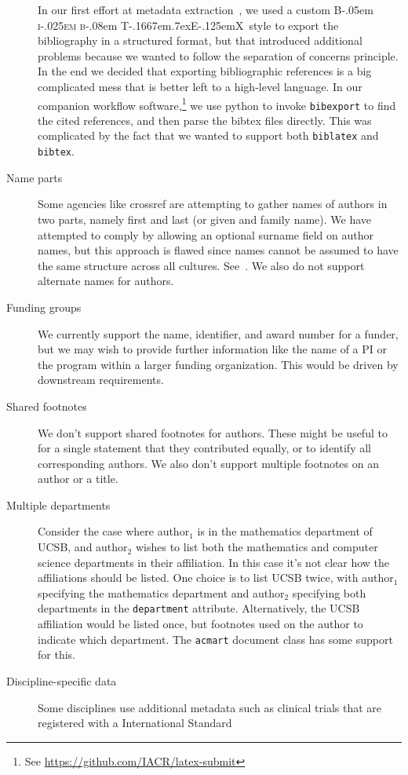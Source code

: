 \documentclass{article}
\newcommand{\BibTeX}{{\rmfamily B\kern-.05em%
   \textsc{i\kern-.025em b}\kern-.08em%
   T\kern-.1667em\lower.7ex\hbox{E}\kern-.125emX}}
\newcommand{\pkg}[1]{\texttt{#1}}
\begin{document}
\begin{description}
In our first effort at metadata extraction~\cite{tugboat}, we used a
custom \BibTeX\ style to export the bibliography in a structured
format, but that introduced additional problems because we wanted to
follow the separation of concerns principle.  In the end we decided
that exporting bibliographic references is a big complicated mess that
is better left to a high-level language.  In our companion workflow
software,\footnote{See \url{https://github.com/IACR/latex-submit}} we
use python to invoke \pkg{bibexport} to find the cited references, and
then parse the bibtex files directly. This was complicated by the fact
that we wanted to support both
\pkg{biblatex} and \pkg{bibtex}.

\item[Name parts] Some agencies like crossref are attempting to gather names of authors in
two parts, namely first and last (or given and family name). We have
attempted to comply by allowing an optional surname field on author
names, but this approach is flawed since names cannot be assumed to
have the same structure across all cultures. See~\cite{falsehoods}.
We also do not support alternate names for authors.
\item[Funding groups] We currently support the name, identifier, and award number for a funder,
but we may wish to provide further information like the name of a PI or the
program within a larger funding organization. This would be driven by downstream requirements.
\item[Shared footnotes] We don't support shared footnotes for authors. These might be useful to
for a single statement that they contributed equally, or to identify all corresponding authors.
We also don't support
multiple footnotes on an author or a title.
\item[Multiple departments] Consider the case where author$_1$ is in the mathematics
department of UCSB, and author$_2$ wishes to list both the mathematics and computer science departments
in their affiliation.  In this case it's not clear how the affiliations should be listed.
One choice is to list UCSB twice, with author$_1$ specifying
the mathematics department and author$_2$ specifying both departments in the \texttt{department}
attribute. Alternatively, the UCSB affiliation would be listed once, but footnotes used on the
author to indicate which department. The \pkg{acmart} document class
has some support for this.
\item[Discipline-specific data] Some disciplines use additional metadata such as
clinical trials that are registered with a International Standard

\end{description}
\end{document}
